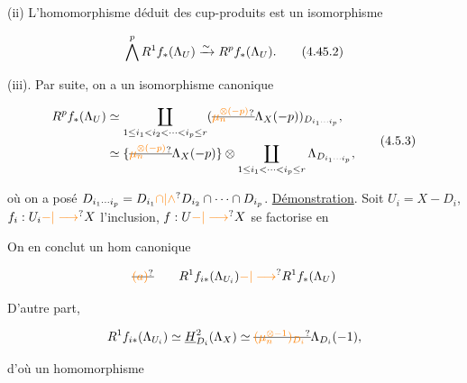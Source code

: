(ii)   L'homomorphisme  déduit des cup-produits est un  isomorphisme

\[
\bigwedge^p R^1 f_*(\Lambda_U)\xrightarrow{\sim}R^p f_*(\Lambda_U).
\tag*{(4.\deleted{4}5.2)}
\]

(iii). Par suite,  on a un isomorphisme canonique

\[
\begin{aligned}
R^p f_*(\Lambda_U)&\simeq\coprod_{1\leq i_1<i_2<\cdots<i_p\leq r}(\deleted{\unsure{\mu_n^{\otimes(-p)}}}\Lambda_X(-p))_{D_{i_1\cdots i_p}},\\
&\simeq\{\deleted{\unsure{\mu_n^{\otimes(-p)}}}\Lambda_X(-p)\}\otimes\coprod_{1\leq i_1<\cdots<i_p\leq r}\Lambda_{D_{i_1\cdots i_p}},
\end{aligned}
\tag*{(4.5.3)}
\]

 où on a posé $D_{i_1\cdots i_p}=D_{i_1}\unsure{\cap|\wedge}D_{i_2}\cap\cdots\cap D_{i_p}$.
\uline{Démonstration}. Soit $U_i=X-D_i$, $f_i:U_i\unsure{{-}|\longrightarrow}X$ l'inclusion,   $f:U\unsure{{-}|\longrightarrow}X$ se factorise en


On en conclut un hom canonique

\[
\deleted{\unsure{(a)}}\qquad R^1 f_{i*}(\Lambda_{U_i})\unsure{{-}|\longrightarrow}R^1 f_*(\Lambda_U)
\]

D'autre part,  

\[
R^1 f_{i*}(\Lambda_{U_i})\simeq\underline H^2_{D_i}(\Lambda_X)\simeq\deleted{\unsure{(\mu_n^{\otimes-1})_{D_i}}}\Lambda_{D_i}(-1),
\]

d'où un homomorphisme

